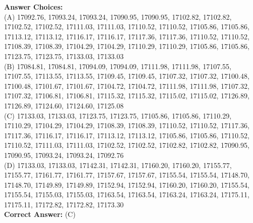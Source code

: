 \begin{ReasoningBox}[title=Time Series Forecasting]
    \textbf{Answer Choices:} \\
    (A) 17092.76, 17093.24, 17093.24, 17090.95, 17090.95, 
17102.82, 17102.82, 17102.52, 17102.52, 17111.03, 17111.03, 17110.52, 17110.52, 17105.86, 17105.86, 17113.12, 17113.12, 17116.17, 17116.17, 17117.36, 17117.36, 17110.52, 17110.52, 17108.39, 17108.39, 17104.29, 17104.29, 17110.29, 17110.29, 17105.86, 17105.86, 17123.75, 17123.75, 17133.03, 17133.03 \\
    (B) 17084.81, 17084.81, 17094.09, 17094.09, 17111.98, 17111.98,
17107.55, 17107.55, 17113.55, 17113.55, 17109.45, 17109.45, 17107.32, 17107.32, 17100.48, 17100.48, 17101.67, 17101.67, 17104.72, 17104.72, 17111.98, 17111.98, 17107.32, 17107.32, 17106.81, 17106.81, 17115.32, 17115.32, 17115.02, 17115.02,
17126.89, 17126.89, 17124.60, 17124.60, 17125.08 \\
    (C) 17133.03, 17133.03, 17123.75, 17123.75, 17105.86, 17105.86,
17110.29, 17110.29, 17104.29, 17104.29, 17108.39, 17108.39, 
17110.52, 17110.52, 17117.36, 17117.36, 17116.17, 17116.17,
17113.12, 17113.12, 17105.86, 17105.86, 17110.52, 17110.52, 
17111.03, 17111.03, 17102.52, 17102.52, 17102.82, 17102.82,
17090.95, 17090.95, 17093.24, 17093.24, 17092.76 \\
    (D) 17133.03, 17133.03, 17142.31, 17142.31, 17160.20, 17160.20,
17155.77, 17155.77, 17161.77, 17161.77, 17157.67, 17157.67, 
17155.54, 17155.54, 17148.70, 17148.70, 17149.89, 17149.89,
17152.94, 17152.94, 17160.20, 17160.20, 17155.54, 17155.54, 
17155.03, 17155.03, 17163.54, 17163.54, 17163.24, 17163.24,
17175.11, 17175.11, 17172.82, 17172.82, 17173.30 \\
    \textbf{Correct Answer:} \textcolor{correctgreen}{(C)} \\
\end{ReasoningBox}